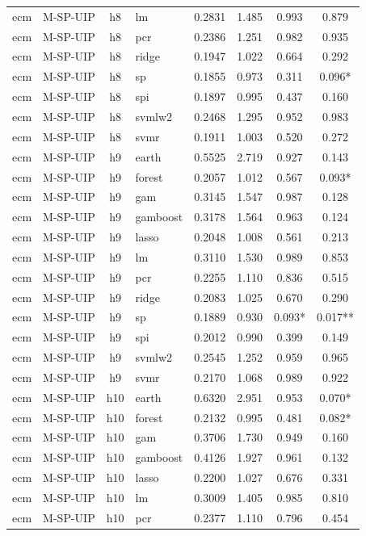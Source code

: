 \begin{ThreePartTable}
\begin{longtable}[t]{llclcccc}
ecm & M-SP-UIP & h8 & lm & 0.2831 & 1.485 & 0.993 & 0.879\\
ecm & M-SP-UIP & h8 & pcr & 0.2386 & 1.251 & 0.982 & 0.935\\
ecm & M-SP-UIP & h8 & ridge & 0.1947 & 1.022 & 0.664 & 0.292\\
ecm & M-SP-UIP & h8 & sp & 0.1855 & 0.973 & 0.311 & 0.096*\\
ecm & M-SP-UIP & h8 & spi & 0.1897 & 0.995 & 0.437 & 0.160\\
ecm & M-SP-UIP & h8 & svmlw2 & 0.2468 & 1.295 & 0.952 & 0.983\\
ecm & M-SP-UIP & h8 & svmr & 0.1911 & 1.003 & 0.520 & 0.272\\
\addlinespace
ecm & M-SP-UIP & h9 & earth & 0.5525 & 2.719 & 0.927 & 0.143\\
ecm & M-SP-UIP & h9 & forest & 0.2057 & 1.012 & 0.567 & 0.093*\\
ecm & M-SP-UIP & h9 & gam & 0.3145 & 1.547 & 0.987 & 0.128\\
ecm & M-SP-UIP & h9 & gamboost & 0.3178 & 1.564 & 0.963 & 0.124\\
ecm & M-SP-UIP & h9 & lasso & 0.2048 & 1.008 & 0.561 & 0.213\\
ecm & M-SP-UIP & h9 & lm & 0.3110 & 1.530 & 0.989 & 0.853\\
ecm & M-SP-UIP & h9 & pcr & 0.2255 & 1.110 & 0.836 & 0.515\\
ecm & M-SP-UIP & h9 & ridge & 0.2083 & 1.025 & 0.670 & 0.290\\
ecm & M-SP-UIP & h9 & sp & 0.1889 & 0.930 & 0.093* & 0.017**\\
ecm & M-SP-UIP & h9 & spi & 0.2012 & 0.990 & 0.399 & 0.149\\
ecm & M-SP-UIP & h9 & svmlw2 & 0.2545 & 1.252 & 0.959 & 0.965\\
ecm & M-SP-UIP & h9 & svmr & 0.2170 & 1.068 & 0.989 & 0.922\\
\addlinespace
ecm & M-SP-UIP & h10 & earth & 0.6320 & 2.951 & 0.953 & 0.070*\\
ecm & M-SP-UIP & h10 & forest & 0.2132 & 0.995 & 0.481 & 0.082*\\
ecm & M-SP-UIP & h10 & gam & 0.3706 & 1.730 & 0.949 & 0.160\\
ecm & M-SP-UIP & h10 & gamboost & 0.4126 & 1.927 & 0.961 & 0.132\\
ecm & M-SP-UIP & h10 & lasso & 0.2200 & 1.027 & 0.676 & 0.331\\
ecm & M-SP-UIP & h10 & lm & 0.3009 & 1.405 & 0.985 & 0.810\\
ecm & M-SP-UIP & h10 & pcr & 0.2377 & 1.110 & 0.796 & 0.454\\

\end{longtable}
\end{ThreePartTable}
